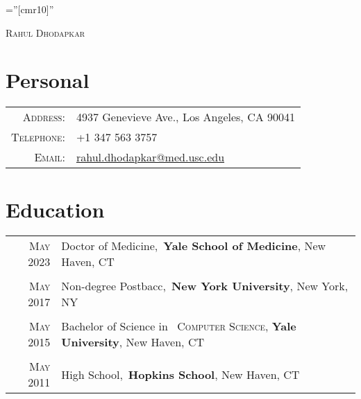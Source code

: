 \documentclass[a4paper,10pt]{article}
\begin{document}

\pagestyle{empty} %

\font\fb=''[cmr10]'' %

\par{\centering
		{\Huge \textsc{Rahul Dhodapkar}
	}\bigskip\par}

\section{Personal}

\begin{tabular}{rl}
    \textsc{Address:}   & 4937 Genevieve Ave., Los Angeles, CA 90041 \\
    \textsc{Telephone:}      & +1 347 563 3757\\
    \textsc{Email:}       & \href{mailto:rahul.dhodapkar@med.usc.edu}{rahul.dhodapkar@med.usc.edu}
\end{tabular}

\section{Education}
\begin{tabular}{rl}	
 \textsc{May} 2023 & Doctor of Medicine,\
 \textbf{Yale School of Medicine}, New Haven, CT\\
\\
 \textsc{May} 2017 & Non-degree Postbacc,\
 \textbf{New York University}, New York, NY\\
\\
 \textsc{May} 2015 & Bachelor of Science in \
 \textsc{Computer Science}, \textbf{Yale University}, New Haven, CT\\
\\
\textsc{May} 2011 & High School,\
 \normalsize \textbf{Hopkins School}, New Haven, CT\\
\end{tabular}
\end{document}
